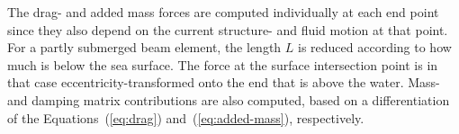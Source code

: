 
The drag- and added mass forces are computed individually at each end point
since they also depend on the current structure- and fluid motion at that point.
For a partly submerged beam element, the length $L$ is reduced according to how
much is below the sea surface. The force at the surface intersection point is in
that case eccentricity-transformed onto the end that is above the water.
Mass- and damping matrix contributions are also computed, based on a
differentiation of the Equations~(\ref{eq:drag}) and~(\ref{eq:added-mass}),
respectively.
